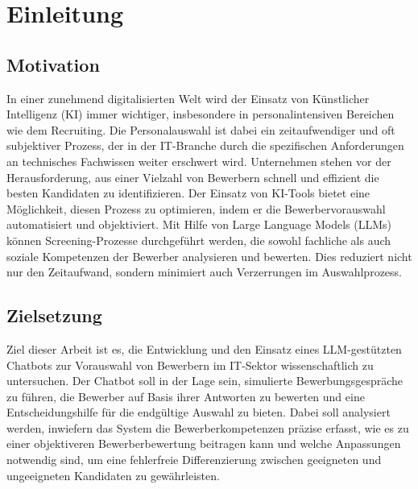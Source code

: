 
\chapter{Einleitung}

\section{Motivation}

In einer zunehmend digitalisierten Welt wird der Einsatz von Künstlicher Intelligenz (KI) immer wichtiger, insbesondere in personalintensiven Bereichen wie dem Recruiting. 
Die Personalauswahl ist dabei ein zeitaufwendiger und oft subjektiver Prozess, der in der IT-Branche durch die spezifischen Anforderungen an technisches Fachwissen weiter erschwert wird. 
Unternehmen stehen vor der Herausforderung, aus einer Vielzahl von Bewerbern schnell und effizient die besten Kandidaten zu identifizieren. 
Der Einsatz von KI-Tools bietet eine Möglichkeit, diesen Prozess zu optimieren, indem er die Bewerbervorauswahl automatisiert und objektiviert. 
Mit Hilfe von Large Language Models (LLMs) können Screening-Prozesse durchgeführt werden, die sowohl fachliche als auch soziale Kompetenzen der Bewerber analysieren und bewerten. 
Dies reduziert nicht nur den Zeitaufwand, sondern minimiert auch Verzerrungen im Auswahlprozess.

\section{Zielsetzung}

Ziel dieser Arbeit ist es, die Entwicklung und den Einsatz eines LLM-gestützten Chatbots zur Vorauswahl von Bewerbern im IT-Sektor wissenschaftlich zu untersuchen. 
Der Chatbot soll in der Lage sein, simulierte Bewerbungsgespräche zu führen, die Bewerber auf Basis ihrer Antworten zu bewerten und eine Entscheidungshilfe für die endgültige Auswahl zu bieten. 
Dabei soll analysiert werden, inwiefern das System die Bewerberkompetenzen präzise erfasst, wie es zu einer objektiveren Bewerberbewertung beitragen kann und welche Anpassungen notwendig sind, um eine fehlerfreie Differenzierung zwischen geeigneten und ungeeigneten Kandidaten zu gewährleisten.
